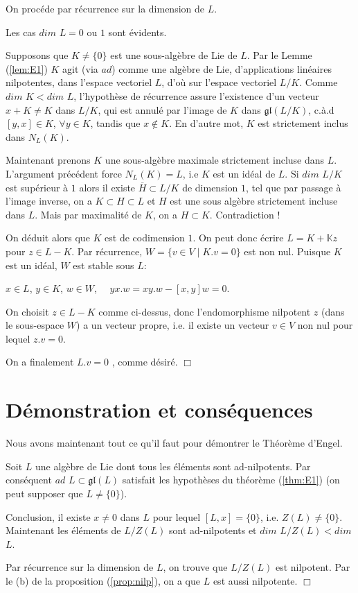 \documentclass[a4paper,openany,12pt]{report}
\newcommand{\KK}{\mathbb{K}}
\newcommand{\gl}{\mathfrak{gl}}
\theoremstyle{break}
{\theorembodyfont{\upshape}
\newtheorem*{rmq}{Remarque :}
\newtheorem*{prv}{Preuve :}
\newtheorem*{ex}{Exemples :}
\newtheorem*{exe}{Exemple : }
\newtheorem*{nota}{Notation :}
\newtheorem*{dem}{D\'emonstration :}}
\begin{document}
\begin{dem}
\quad On procéde par récurrence sur la dimension de $L$.

Les cas $dim$ $L = 0$ ou $1$ sont évidents.

Supposons que $K \neq \{0\}$ est une sous-algèbre de Lie de $L$. Par le Lemme (\ref{lem:E1}) $K$ agit (via $ad$) comme une algèbre de Lie, d'applications linéaires nilpotentes, dans l'espace vectoriel $L$, d'où sur l'espace vectoriel $L/K$. Comme $dim$ $K < dim$ $L$, l'hypothèse de récurrence assure l’existence d'un vecteur $x + K \neq K $ dans $L/K$, qui est annulé par l'image de $K$ dans $\gl(L/K)$, c.à.d $[y,x] \in K$, $\forall y \in K$, tandis que $x \notin K$. En d'autre mot, $K$ est strictement inclus dans $N_{L}(K)$.

Maintenant prenons $K$ une sous-algèbre maximale strictement incluse dans $L$. L'argument précédent force $N_{L}(K) = L$, i.e $K$ est un idéal de $L$. Si $dim$ $L/K$ est supérieur à $1$ alors il existe $\overline{H} \subset L/K$ de dimension $1$, tel que par passage à l'image inverse, on a $K \subset H \subset L$ et $H$ est une sous algèbre strictement incluse dans $L$. Mais par maximalité de $K$, on a $H \subset K$. Contradiction !

On déduit alors que $K$ est de codimension $1$. On peut donc écrire $L=K+ \KK z$ pour $z \in L-K$. Par récurrence, $W = \{ v \in V \mid K.v = 0\}$ est non nul. Puisque $K$ est un idéal, $W$ est stable sous $L$: 
\begin{center}
$x \in L$, $y \in K$, $w \in W$, $\quad yx.w = xy.w - [x,y]w =0$.
\end{center}
\quad On choisit $z \in L-K$ comme ci-dessus, donc l'endomorphisme nilpotent $z$ (dans le sous-espace $W$) a un vecteur propre, i.e. il existe un vecteur $v \in V$ non nul pour lequel $z.v = 0$.

On a finalement $L.v = 0$ , comme désiré. $\Box$
\end{dem}

\section{Démonstration et conséquences}

Nous avons maintenant tout ce qu'il faut pour démontrer le Théorème d'Engel.

\begin{dem}
\quad Soit $L$ une algèbre de Lie dont tous les éléments sont ad-nilpotents. Par conséquent $ad$ $L \subset \gl(L)$  satisfait les hypothèses du théorème (\ref{thm:E1}) (on peut supposer que $L \neq \{0 \}$).

Conclusion, il existe $x \neq 0$ dans $L$ pour lequel $[L,x]=\{0\}$, i.e. $Z(L) \neq \{0\}$. Maintenant les éléments de $L/Z(L)$ sont ad-nilpotents et $dim$ $L/Z(L) < dim$ $L$.

Par récurrence sur la dimension de $L$, on  trouve que $L/Z(L)$ est nilpotent. Par le (b) de la proposition (\ref{prop:nilp}), on a que $L$ est aussi nilpotente. $\Box$
\end{dem}
\end{document}

